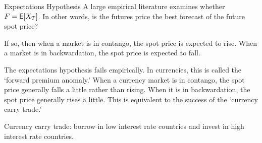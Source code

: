 \documentclass[xcolor=dvipsnames,10pt]{beamer}
\begin{document}
\begin{frame}{Expectations Hypothesis}
   A large empirical literature examines whether $F = \mathsf{E}[X_T]$.  In other words, is the futures price the best forecast of the future spot price?
   
   If so, then when a market is in contango, the spot price is expected to rise.  When a market is in backwardation, the spot price is expected to fall.
   
   The expectations hypothesis fails empirically.  In currencies, this is called the `forward premium anomaly.'  When a currency market is in contango, the spot price generally falls a little rather than rising.  When it is in backwardation, the spot price generally rises a little.  This is equivalent to the success of the `currency carry trade.'  
   
   Currency carry trade: borrow in low interest rate countries and invest in high interest rate countries.
\end{frame}
\end{document}
